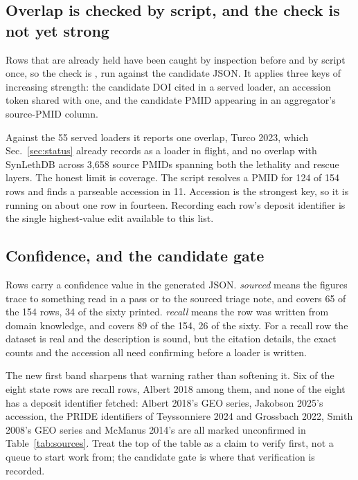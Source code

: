 \subsection{Overlap is checked by script, and the check is not yet strong}\label{sec:overlap}

Rows that are already held have been caught by inspection before and by script once, so
the check is , run against
the candidate JSON. It applies three keys of increasing strength: the candidate DOI cited
in a served loader, an accession token shared with one, and the candidate PMID appearing in
an aggregator's source-PMID column.

Against the 55 served loaders it reports one overlap, Turco 2023, which
Sec.~\ref{sec:status} already records as a loader in flight, and no overlap with SynLethDB
across 3,658 source PMIDs spanning both the lethality and rescue layers. The honest limit
is coverage. The script resolves a PMID for 124 of 154 rows and finds a parseable
accession in 11. Accession is the strongest key, so it is running on about one row in
fourteen. Recording each row's deposit identifier is the single highest-value edit
available to this list.

\subsection{Confidence, and the candidate gate}\label{sec:confidence}

Rows carry a confidence value in the generated JSON. \emph{sourced} means the figures trace
to something read in a pass or to the sourced triage note, and covers 65 of the 154 rows,
34 of the sixty printed. \emph{recall} means the row was written from domain knowledge,
and covers 89 of the 154, 26 of the sixty. For a recall row the dataset is real and the
description is sound, but the citation details, the exact counts and the accession all
need confirming before a loader is written.

The new first band sharpens that warning rather than softening it. Six of the eight state
rows are recall rows, Albert 2018 among them, and none of the eight has a deposit
identifier fetched: Albert 2018's GEO series, Jakobson 2025's accession, the PRIDE
identifiers of Teyssonniere 2024 and Grossbach 2022, Smith 2008's GEO series and
McManus 2014's are all marked unconfirmed in Table~\ref{tab:sources}. Treat the top of the
table as a claim to verify first, not a queue to start work from; the candidate gate is
where that verification is recorded.

